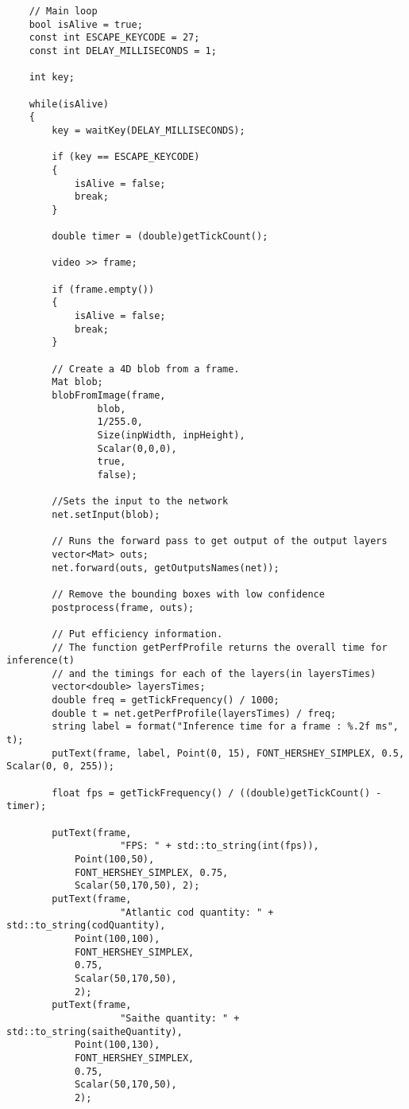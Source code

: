 \begin{verbatim}
    // Main loop
    bool isAlive = true;
    const int ESCAPE_KEYCODE = 27;
    const int DELAY_MILLISECONDS = 1;

    int key;

    while(isAlive)
    {
        key = waitKey(DELAY_MILLISECONDS);

        if (key == ESCAPE_KEYCODE)
        {
            isAlive = false;
            break;
        }

        double timer = (double)getTickCount();

        video >> frame;

        if (frame.empty())
        {
            isAlive = false;
            break;
        }

        // Create a 4D blob from a frame.
        Mat blob;
        blobFromImage(frame, 
        		blob,
        		1/255.0,
        		Size(inpWidth, inpHeight),
        		Scalar(0,0,0),
        		true,
        		false);

        //Sets the input to the network
        net.setInput(blob);

        // Runs the forward pass to get output of the output layers
        vector<Mat> outs;
        net.forward(outs, getOutputsNames(net));

        // Remove the bounding boxes with low confidence
        postprocess(frame, outs);

        // Put efficiency information.
        // The function getPerfProfile returns the overall time for inference(t)
        // and the timings for each of the layers(in layersTimes)
        vector<double> layersTimes;
        double freq = getTickFrequency() / 1000;
        double t = net.getPerfProfile(layersTimes) / freq;
        string label = format("Inference time for a frame : %.2f ms", t);
        putText(frame, label, Point(0, 15), FONT_HERSHEY_SIMPLEX, 0.5, Scalar(0, 0, 255));

        float fps = getTickFrequency() / ((double)getTickCount() - timer);

        putText(frame,
        		    "FPS: " + std::to_string(int(fps)),
		    Point(100,50),
		    FONT_HERSHEY_SIMPLEX, 0.75,
		    Scalar(50,170,50), 2);
        putText(frame,
        		    "Atlantic cod quantity: " + std::to_string(codQuantity),
		    Point(100,100),
		    FONT_HERSHEY_SIMPLEX,
		    0.75,
		    Scalar(50,170,50),
		    2);
        putText(frame,
        		    "Saithe quantity: " + std::to_string(saitheQuantity),
		    Point(100,130),
		    FONT_HERSHEY_SIMPLEX,
		    0.75,
		    Scalar(50,170,50),
		    2);


\end{verbatim}
